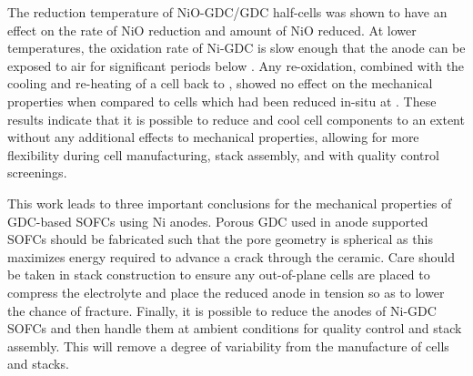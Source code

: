 The reduction temperature of NiO-GDC/GDC half-cells was shown to have an effect on the rate of NiO reduction and amount of NiO reduced.
At lower temperatures, the oxidation rate of Ni-GDC is slow enough that the anode can be exposed to air for significant periods below .
Any re-oxidation, combined with the cooling and re-heating of a cell back to
, showed no effect on the mechanical properties when compared to cells which had been reduced in-situ at .
These results indicate that it is possible to reduce and cool cell components to an extent without any additional effects to mechanical properties, allowing for more flexibility during cell manufacturing, stack assembly, and with quality control screenings.

This work leads to three important conclusions for the mechanical properties of GDC-based SOFCs using Ni anodes.
Porous GDC used in anode supported SOFCs should be fabricated such that the pore geometry is spherical as this maximizes energy required to advance a crack through the ceramic.
Care should be taken in stack construction to ensure any out-of-plane cells are placed to compress the electrolyte and place the reduced anode in tension so as to lower the chance of fracture.
Finally, it is possible to reduce the anodes of Ni-GDC SOFCs and then handle them at ambient conditions for quality control and stack assembly.
This will remove a degree of variability from the manufacture of cells and stacks.
